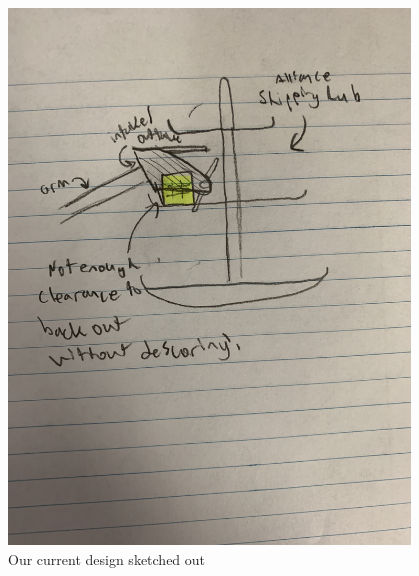 \begin{figure}[htp]
\centering
\includegraphics[width=0.95\textwidth, angle=0]{Meetings/January/01-09-22/IMG_3223 - Nathan Forrer.JPG}
\caption{Our current design sketched out}
\label{fig:010922_1}
\end{figure}


